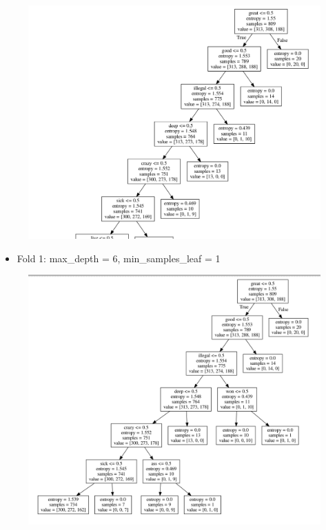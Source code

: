 \documentclass[11pt]{article}
\makeatletter
\def\maxwidth{\ifdim\Gin@nat@width>\linewidth\linewidth
    \else\Gin@nat@width\fi}
\let\Oldincludegraphics\includegraphics
\renewcommand{\includegraphics}[1]{\Oldincludegraphics[width=.8\maxwidth]{#1}}
\providecommand{\tightlist}{%
      \setlength{\itemsep}{0pt}\setlength{\parskip}{0pt}}
\makeatother
\begin{document}
\begin{figure}[H]
\centering
\includegraphics{../fold1_14_1.png}
\caption{}
\end{figure}

\begin{itemize}
\tightlist
\item
  Fold 1: max\_depth = 6, min\_samples\_leaf = 1
\end{itemize}

\begin{figure}[H]
\centering
\includegraphics{../fold1_6_1.png}
\caption{}
\end{figure}
\end{document}
